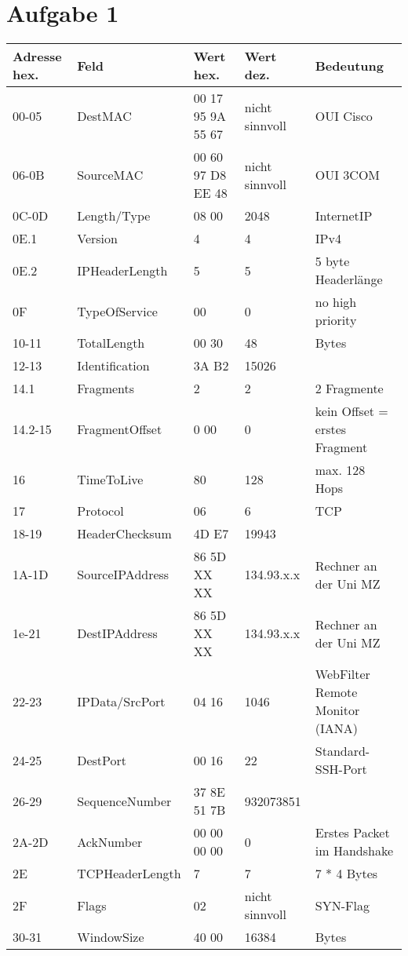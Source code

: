 \section{Aufgabe 1}

\begin{tabular}{|l|l|l|l|l|}\hline
Adresse hex. & Feld & Wert hex. & Wert dez. & Bedeutung \\\hline\hline
00-05 & DestMAC & 00 17 95 9A 55 67 & nicht sinnvoll & OUI Cisco \\\hline
06-0B & SourceMAC & 00 60 97 D8 EE 48 & nicht sinnvoll & OUI 3COM \\\hline
0C-0D & Length/Type & 08 00 & 2048 & InternetIP \\\hline\hline
0E.1 & Version & 4 & 4 & IPv4 \\\hline
0E.2 & IPHeaderLength & 5 & 5 & 5 byte Headerlänge \\\hline
0F & TypeOfService & 00 & 0 & no high priority\\\hline
10-11 & TotalLength & 00 30 & 48 & Bytes \\\hline
12-13 & Identification & 3A B2 & 15026 & \\\hline
14.1 & Fragments & 2 & 2 & 2 Fragmente \\\hline
14.2-15 & FragmentOffset & 0 00 & 0 & kein Offset = erstes Fragment\\\hline
16 & TimeToLive & 80 & 128 & max. 128 Hops \\\hline
17 & Protocol & 06 & 6 & TCP \\\hline
18-19 & HeaderChecksum & 4D E7 & 19943 & \\\hline
1A-1D & SourceIPAddress & 86 5D XX XX & 134.93.x.x & Rechner an der Uni MZ \\\hline
1e-21 & DestIPAddress & 86 5D XX XX & 134.93.x.x & Rechner an der Uni MZ \\\hline\hline
22-23 & IPData/SrcPort & 04 16 & 1046 & WebFilter Remote Monitor (IANA) \\\hline
24-25 & DestPort & 00 16 & 22 & Standard-SSH-Port \\\hline
26-29 & SequenceNumber & 37 8E 51 7B & 932073851 & \\\hline
2A-2D & AckNumber & 00 00 00 00 & 0 & Erstes Packet im Handshake \\\hline
2E & TCPHeaderLength & 7 & 7 & 7 * 4 Bytes\\\hline
2F & Flags & 02 & nicht sinnvoll & SYN-Flag \\\hline
30-31 & WindowSize & 40 00 & 16384 & Bytes \\\hline

\end{tabular}
